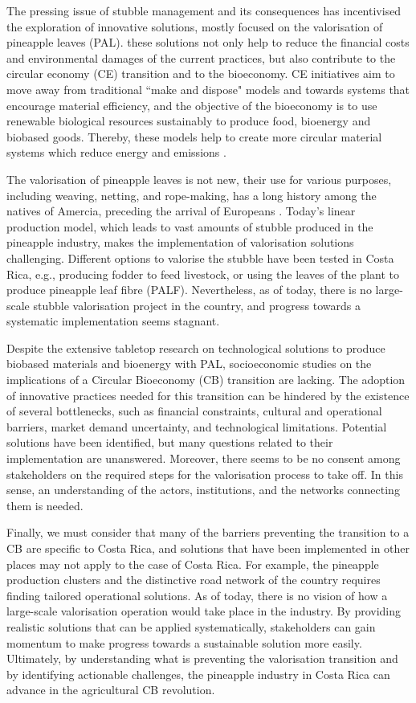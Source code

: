 The pressing issue of stubble management and its consequences has incentivised the exploration of innovative solutions, mostly focused on the valorisation of pineapple leaves (PAL). these solutions not only help to reduce the financial costs and environmental damages of the current practices, but also contribute to the circular economy (CE) transition and to the bioeconomy. CE initiatives aim to move away from traditional ``make and dispose" models and towards systems that encourage material efficiency, and the objective of the bioeconomy is to use renewable biological resources sustainably to produce food, bioenergy and biobased goods. Thereby, these models help to create more circular material systems which reduce energy and emissions \citep{IPCC_2022_WGIII_SPM}. 

The valorisation of pineapple leaves is not new, their use for various purposes, including weaving, netting, and rope-making, has a long history among the natives of Amercia, preceding the arrival of Europeans \citep{collins1949history, o2013pineapple}. Today's linear production model, which leads to vast amounts of stubble produced in the pineapple industry, makes the implementation of valorisation solutions challenging. Different options to valorise the stubble have been tested in Costa Rica, e.g., producing fodder to feed livestock, or using the leaves of the plant to produce pineapple leaf fibre (PALF). Nevertheless, as of today, there is no large-scale stubble valorisation project in the country, and progress towards a systematic implementation seems stagnant. 

Despite the extensive tabletop research on technological solutions to produce biobased materials and bioenergy with PAL, socioeconomic studies on the implications of a Circular Bioeconomy (CB) transition are lacking. The adoption of innovative practices needed for this transition can be hindered by the existence of several bottlenecks, such as financial constraints, cultural and operational barriers, market demand uncertainty, and technological limitations. Potential solutions have been identified, but many questions related to their implementation are unanswered. Moreover, there seems to be no consent among stakeholders on the required steps for the valorisation process to take off. In this sense, an understanding of the actors, institutions, and the networks connecting them is needed. 

Finally, we must consider that many of the barriers preventing the transition to a CB are specific to Costa Rica, and solutions that have been implemented in other places may not apply to the case of Costa Rica. For example, the pineapple production clusters and the distinctive road network of the country requires finding tailored operational solutions. As of today, there is no vision of how a large-scale valorisation operation would take place in the industry. By providing realistic solutions that can be applied systematically, stakeholders can gain momentum to make progress towards a sustainable solution more easily. Ultimately, by understanding what is preventing the valorisation transition and by identifying actionable challenges, the pineapple industry in Costa Rica can advance in the agricultural CB revolution. 

